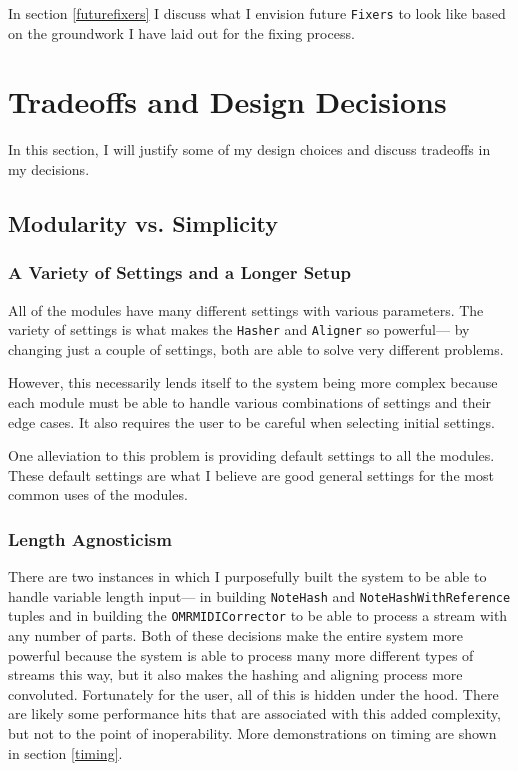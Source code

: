 In section \ref{futurefixers} I discuss what I envision future \texttt{Fixers} to look like based on the groundwork I have laid out for the fixing process.

\section{Tradeoffs and Design Decisions}

In this section, I will justify some of my design choices and discuss tradeoffs in my decisions. 

\subsection{Modularity vs. Simplicity}
\subsubsection{A Variety of Settings and a Longer Setup}
All of the modules have many different settings with various parameters. The variety of settings is what makes the \texttt{Hasher} and \texttt{Aligner} so powerful--- by changing just a couple of settings, both are able to solve very different problems.

However, this necessarily lends itself to the system being more complex because each module must be able to handle various combinations of settings and their edge cases. It also requires the user to be careful when selecting initial settings. 

One alleviation to this problem is providing default settings to all the modules. These default settings are what I believe are good general settings for the most common uses of the modules. 

\subsubsection{Length Agnosticism}
There are two instances in which I purposefully built the system to be able to handle variable length input--- in building \texttt{NoteHash} and \texttt{NoteHashWithReference} tuples and in building the \texttt{OMRMIDICorrector} to be able to process a stream with any number of parts. Both of these decisions make the entire system more powerful because the system is able to process many more different types of streams this way, but it also makes the hashing and aligning process more convoluted. Fortunately for the user, all of this is hidden under the hood. There are likely some performance hits that are associated with this added complexity, but not to the point of inoperability. More demonstrations on timing are shown in section \ref{timing}.

